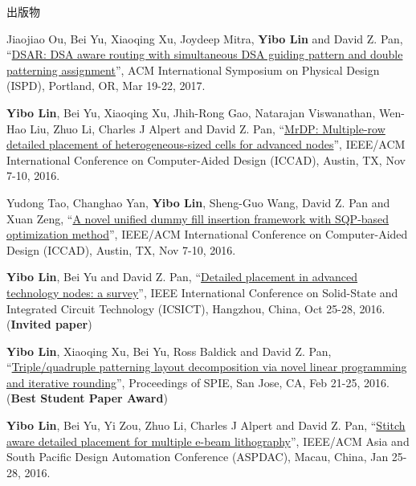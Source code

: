 \begin{rSection}{出版物}
\begin{description}[font=\normalfont]
{}
            

\item[{[C9]}]{
        Jiaojiao Ou, Bei Yu, Xiaoqing Xu, Joydeep Mitra, \textbf{Yibo Lin} and David Z. Pan, 
    ``\href{https://doi.org/10.1145/3036669.3036677}{DSAR: DSA aware routing with simultaneous DSA guiding pattern and double patterning assignment}'', 
    ACM International Symposium on Physical Design (ISPD), Portland, OR, Mar 19-22, 2017.
    
}
            

\item[{[C8]}]{
        \textbf{Yibo Lin}, Bei Yu, Xiaoqing Xu, Jhih-Rong Gao, Natarajan Viswanathan, Wen-Hao Liu, Zhuo Li, Charles J Alpert and David Z. Pan, 
    ``\href{http://dx.doi.org/10.1145/2966986.2967055}{MrDP: Multiple-row detailed placement of heterogeneous-sized cells for advanced nodes}'', 
    IEEE/ACM International Conference on Computer-Aided Design (ICCAD), Austin, TX, Nov 7-10, 2016.
    
}
            

\item[{[C7]}]{
        Yudong Tao, Changhao Yan, \textbf{Yibo Lin}, Sheng-Guo Wang, David Z. Pan and Xuan Zeng, 
    ``\href{http://dx.doi.org/10.1145/2966986.2966994}{A novel unified dummy fill insertion framework with SQP-based optimization method}'', 
    IEEE/ACM International Conference on Computer-Aided Design (ICCAD), Austin, TX, Nov 7-10, 2016.
    
}
            

\item[{[C6]}]{
        \textbf{Yibo Lin}, Bei Yu and David Z. Pan, 
    ``\href{https://doi.org/10.1109/ICSICT.2016.7999056}{Detailed placement in advanced technology nodes: a survey}'', 
    IEEE International Conference on Solid-State and Integrated Circuit Technology (ICSICT), Hangzhou, China, Oct 25-28, 2016.
    (\textbf{Invited paper})
}
            

\item[{[C5]}]{
        \textbf{Yibo Lin}, Xiaoqing Xu, Bei Yu, Ross Baldick and David Z. Pan, 
    ``\href{http://dx.doi.org/10.1117/12.2218628}{Triple/quadruple patterning layout decomposition via novel linear programming and iterative rounding}'', 
    Proceedings of SPIE, San Jose, CA, Feb 21-25, 2016.
    (\textbf{Best Student Paper Award})
}
            

\item[{[C4]}]{
        \textbf{Yibo Lin}, Bei Yu, Yi Zou, Zhuo Li, Charles J Alpert and David Z. Pan, 
    ``\href{http://ieeexplore.ieee.org/xpl/articleDetails.jsp?arnumber=7428009}{Stitch aware detailed placement for multiple e-beam lithography}'', 
    IEEE/ACM Asia and South Pacific Design Automation Conference (ASPDAC), Macau, China, Jan 25-28, 2016.
    
}
\end{description}
\end{rSection}
